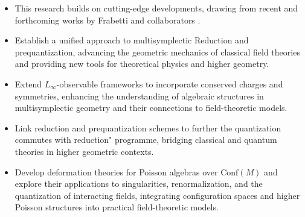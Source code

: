 \documentclass[11pt,a4paper]{article}
\begin{document}
\begin{itemize}[noitemsep,topsep=0pt,parsep=0pt,partopsep=0pt]	
    \item   This research builds on cutting-edge developments, drawing from recent and forthcoming works by Frabetti and collaborators \cite{Frabetti2024, Frabetti2025}.
    \item  Establish a unified approach to multisymplectic Reduction and prequantization, advancing the geometric mechanics of classical field theories and providing new tools for theoretical physics and higher geometry.
    \item Extend $L_\infty$-observable frameworks to incorporate conserved charges and symmetries, enhancing the understanding of algebraic structures in multisymplectic geometry and their connections to field-theoretic models.
    \item Link reduction and prequantization schemes to further the quantization commutes with reduction" programme, bridging classical and quantum theories in higher geometric contexts.
    \item Develop deformation theories for Poisson algebras over $\mathrm{Conf}(M)$ and explore their applications to singularities, renormalization, and the quantization of interacting fields, integrating configuration spaces and higher Poisson structures into practical field-theoretic models.
\end{itemize}



\footnotesize


%
\end{document}
